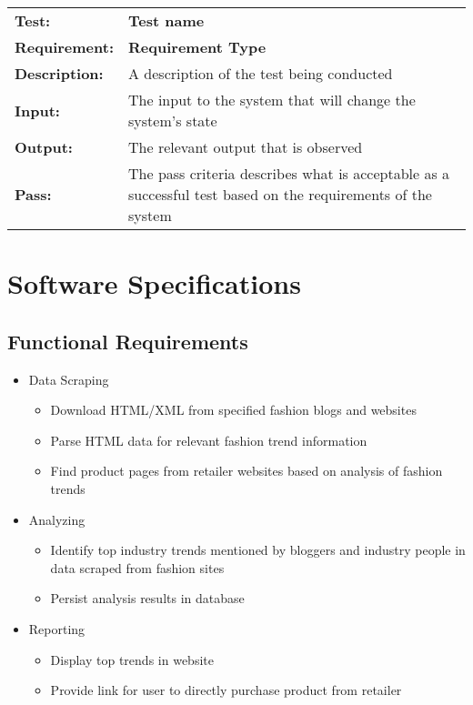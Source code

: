 \documentclass{article}
\begin{document}
	\begin{mdframed}[linewidth=1pt]
	\begin{tabularx}{\textwidth}{@{}p{3cm}X@{}}
	{\bf Test:} & {\bf Test name}\\[\baselineskip]
	{\bf Requirement:} & {\bf Requirement Type}\\[\baselineskip]
	{\bf Description:} & A description of the test being conducted\\[0.5\baselineskip]
	{\bf Input:} &  The input to the system that will change the system's state\\[0.5\baselineskip]
	{\bf Output:} & The relevant output that is observed\\[0.5\baselineskip]
	{\bf Pass:} & The pass criteria describes what is acceptable as a successful test based on the requirements of the system
	\end{tabularx}
	\end{mdframed}
		
	

\newpage


\section{Software Specifications}
		
	\subsection{Functional Requirements}
		\begin{itemize}
			\item Data Scraping
				\begin{itemize}
					\item Download HTML/XML from specified fashion blogs and websites	
					\item	 Parse HTML data for relevant fashion trend information
					\item	 Find product pages from retailer websites based on analysis of fashion trends
				\end{itemize}
			\item Analyzing
				\begin{itemize}
					\item Identify top industry trends mentioned by bloggers and industry people in data scraped from fashion sites
					\item	Persist analysis results in database
				\end{itemize}
			\item Reporting
				\begin{itemize}
					\item Display top trends in website
					\item Provide link for user to directly purchase product from retailer
				\end{itemize}
		\end{itemize}
\end{document}
